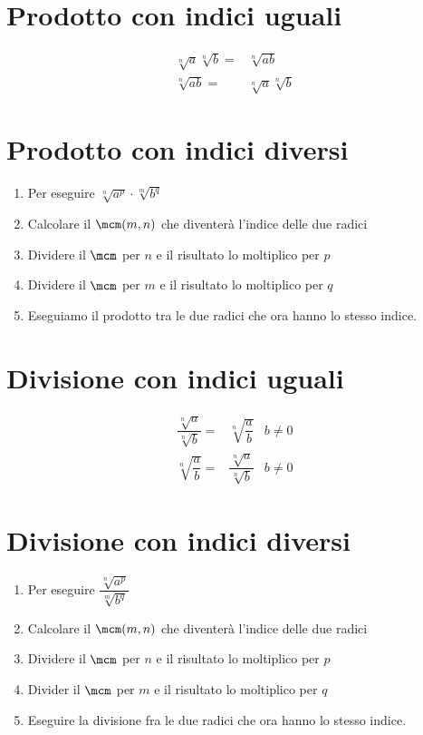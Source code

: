 \section{Prodotto con indici uguali}
\begin{align*}
\sqrt[n]{a}\sqrt[n]{b}=&\sqrt[n]{ab}\\
\sqrt[n]{ab}=&\sqrt[n]{a}\sqrt[n]{b}
\end{align*}
\section{Prodotto con indici diversi}
\begin{enumerate}
	\item Per eseguire $\sqrt[n]{a^p}\cdot\sqrt[m]{b^q}$
	\item Calcolare il $\mcm(m,n)$ che diventerà l'indice  delle due radici
	\item Dividere il  $\mcm$ per $n$ e il risultato lo moltiplico per $p$
	\item Dividere il  $\mcm$ per $m$ e il risultato lo moltiplico per $q$
	\item Eseguiamo  il prodotto tra le due radici che ora hanno lo stesso indice.
\end{enumerate}
\section{Divisione con indici uguali}
\begin{align*}
\dfrac{\sqrt[n]{a}}{\sqrt[n]{b}}=&\sqrt[n]{\dfrac{a}{b}}&b\neq 0\\
\sqrt[n]{\dfrac{a}{b}}=&\dfrac{\sqrt[n]{a}}{\sqrt[n]{b}}&b\neq 0
\end{align*}
\section{Divisione con indici diversi}
\begin{enumerate}
	\item Per eseguire
	$\dfrac{\sqrt[n]{a^p}}{\sqrt[m]{b^q}}$
	\item Calcolare il $\mcm(m,n)$ che diventerà l'indice  delle due radici
	\item Dividere il  $\mcm$ per $n$ e il risultato lo moltiplico per $p$
	\item Divider il  $\mcm$ per $m$ e il risultato lo moltiplico per $q$
	\item Eseguire la divisione fra le due radici che ora hanno lo stesso indice.
\end{enumerate}
